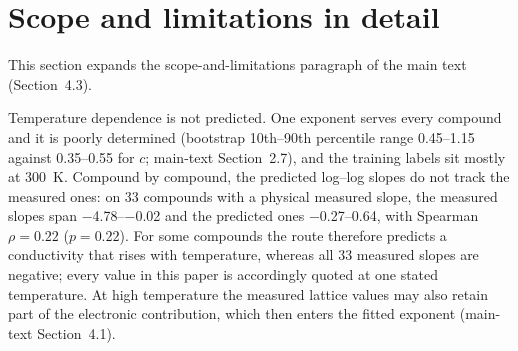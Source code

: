 \documentclass[preprint, 12pt]{elsarticle}
\begin{document}

\section{Scope and limitations in detail}
\label{sec:S-limitations}

This section expands the scope-and-limitations paragraph of the main text (Section~4.3).

Temperature dependence is not predicted. One exponent serves every compound and it is poorly
determined (bootstrap 10th--90th percentile range \numrange{0.45}{1.15} against \numrange{0.35}{0.55} for $c$;
main-text Section~2.7), and the training labels sit mostly at \SI{300}{\kelvin}. Compound by
compound, the predicted log--log slopes do not track the measured ones: on \num{33} compounds with a
physical measured slope, the measured slopes span \numrange{-4.78}{-0.02} and the predicted ones
\numrange{-0.27}{0.64}, with Spearman $\rho = \num{0.22}$ ($p = \num{0.22}$). For some compounds the
route therefore predicts a conductivity that rises with temperature, whereas all \num{33} measured
slopes are negative; every value in this paper is accordingly quoted at one stated temperature. At high
temperature the measured lattice values may also retain part of the electronic contribution, which
then enters the fitted exponent (main-text Section~4.1).
\end{document}

